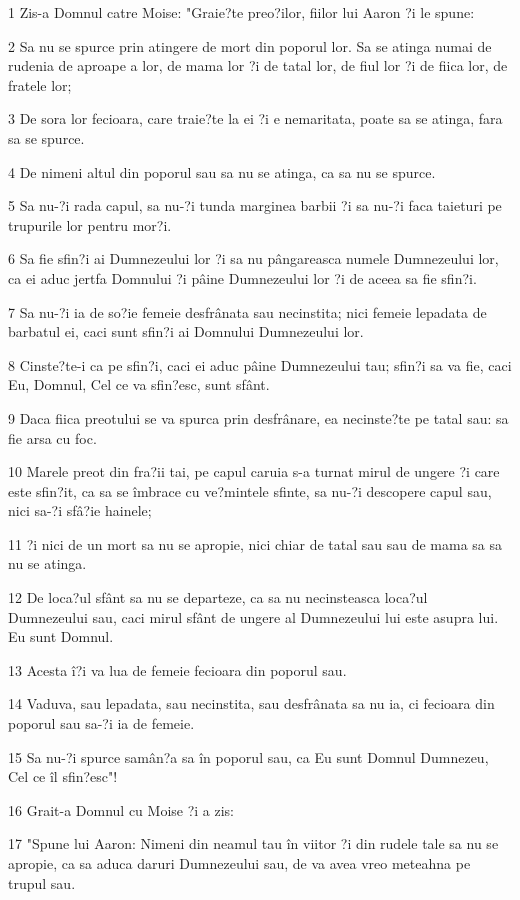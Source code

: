 \par 1 Zis-a Domnul catre Moise: "Graie?te preo?ilor, fiilor lui Aaron ?i le spune:
\par 2 Sa nu se spurce prin atingere de mort din poporul lor. Sa se atinga numai de rudenia de aproape a lor, de mama lor ?i de tatal lor, de fiul lor ?i de fiica lor, de fratele lor;
\par 3 De sora lor fecioara, care traie?te la ei ?i e nemaritata, poate sa se atinga, fara sa se spurce.
\par 4 De nimeni altul din poporul sau sa nu se atinga, ca sa nu se spurce.
\par 5 Sa nu-?i rada capul, sa nu-?i tunda marginea barbii ?i sa nu-?i faca taieturi pe trupurile lor pentru mor?i.
\par 6 Sa fie sfin?i ai Dumnezeului lor ?i sa nu pângareasca numele Dumnezeului lor, ca ei aduc jertfa Domnului ?i pâine Dumnezeului lor ?i de aceea sa fie sfin?i.
\par 7 Sa nu-?i ia de so?ie femeie desfrânata sau necinstita; nici femeie lepadata de barbatul ei, caci sunt sfin?i ai Domnului Dumnezeului lor.
\par 8 Cinste?te-i ca pe sfin?i, caci ei aduc pâine Dumnezeului tau; sfin?i sa va fie, caci Eu, Domnul, Cel ce va sfin?esc, sunt sfânt.
\par 9 Daca fiica preotului se va spurca prin desfrânare, ea necinste?te pe tatal sau: sa fie arsa cu foc.
\par 10 Marele preot din fra?ii tai, pe capul caruia s-a turnat mirul de ungere ?i care este sfin?it, ca sa se îmbrace cu ve?mintele sfinte, sa nu-?i descopere capul sau, nici sa-?i sfâ?ie hainele;
\par 11 ?i nici de un mort sa nu se apropie, nici chiar de tatal sau sau de mama sa sa nu se atinga.
\par 12 De loca?ul sfânt sa nu se departeze, ca sa nu necinsteasca loca?ul Dumnezeului sau, caci mirul sfânt de ungere al Dumnezeului lui este asupra lui. Eu sunt Domnul.
\par 13 Acesta î?i va lua de femeie fecioara din poporul sau.
\par 14 Vaduva, sau lepadata, sau necinstita, sau desfrânata sa nu ia, ci fecioara din poporul sau sa-?i ia de femeie.
\par 15 Sa nu-?i spurce samân?a sa în poporul sau, ca Eu sunt Domnul Dumnezeu, Cel ce îl sfin?esc"!
\par 16 Grait-a Domnul cu Moise ?i a zis:
\par 17 "Spune lui Aaron: Nimeni din neamul tau în viitor ?i din rudele tale sa nu se apropie, ca sa aduca daruri Dumnezeului sau, de va avea vreo meteahna pe trupul sau.
